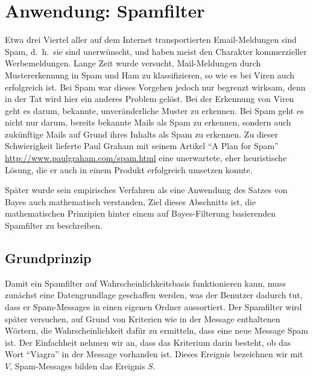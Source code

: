 %
%
%
\section{Anwendung: Spamfilter}
\label{spamfilter}
Etwa drei Viertel aller auf dem Internet transportierten Email-Meldungen
sind Spam, d.~h.~sie sind unerwünscht, und haben meist den Charakter
kommerzieller Werbemeldungen.
Lange Zeit wurde versucht, Mail-Meldungen
durch Mustererkennung in Spam und Ham zu klassifizieren, so wie es bei
Viren auch erfolgreich ist.
Bei Spam war dieses Vorgehen jedoch nur begrenzt
wirksam, denn in der Tat wird hier ein anderes Problem gelöst.
Bei der Erkennung von Viren geht es darum, bekannte, unveränderliche
Muster zu erkennen.
Bei Spam geht es nicht nur darum, bereits bekannte
Mails als Spam zu erkennen, sondern auch zukünftige Mails auf Grund
ihres Inhalts als Spam zu erkennen.
Zu dieser Schwierigkeit lieferte
Paul Graham mit seinem Artikel ``A Plan for Spam'' \url{http://www.paulgraham.com/spam.html} eine unerwartete, eher heuristische Lösung, die er auch in
einem Produkt erfolgreich umsetzen konnte.

Später wurde sein empirisches Verfahren als eine Anwendung des Satzes von
Bayes auch mathematisch verstanden, Ziel dieses Abschnitts ist,
die mathematischen Prinzipien hinter einem auf Bayes-Filterung
basierenden Spamfilter zu beschreiben.

\subsection{Grundprinzip}
Damit ein Spamfilter auf Wahrscheinlichkeitsbasis funktionieren kann, muss
zunächst eine Datengrundlage geschaffen werden, was der Benutzer dadurch
tut, dass er Spam-Messages in einen eigenen Ordner aussortiert.
Der Spamfilter wird später versuchen, auf Grund von Kriterien wie in
der Message enthaltenen Wörtern, die Wahrscheinlichkeit dafür zu ermitteln,
dass eine neue Message Spam ist.
Der Einfachheit nehmen wir an, dass
das Kriterium darin besteht, ob das Wort ``Viagra'' in der Message
vorhanden ist.
Dieses Ereignis bezeichnen wir mit $V$, Spam-Messages bilden
das Ereignis $S$.

